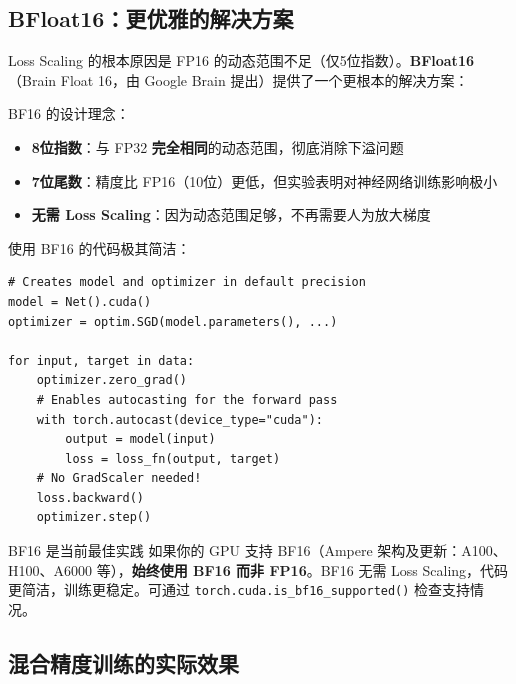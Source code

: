 \documentclass[a4paper]{article}
\begin{document}
\subsection{BFloat16：更优雅的解决方案}

Loss Scaling 的根本原因是 FP16 的动态范围不足（仅5位指数）。\textbf{BFloat16}（Brain Float 16，由 Google Brain 提出）提供了一个更根本的解决方案：





BF16 的设计理念：

\begin{itemize}
    \item \textbf{8位指数}：与 FP32 \textbf{完全相同}的动态范围，彻底消除下溢问题
    \item \textbf{7位尾数}：精度比 FP16（10位）更低，但实验表明对神经网络训练影响极小
    \item \textbf{无需 Loss Scaling}：因为动态范围足够，不再需要人为放大梯度
\end{itemize}





使用 BF16 的代码极其简洁：

\begin{lstlisting}[caption={PyTorch 中的 BF16 混合精度训练（无需 GradScaler）}]
# Creates model and optimizer in default precision
model = Net().cuda()
optimizer = optim.SGD(model.parameters(), ...)

for input, target in data:
    optimizer.zero_grad()
    # Enables autocasting for the forward pass
    with torch.autocast(device_type="cuda"):
        output = model(input)
        loss = loss_fn(output, target)
    # No GradScaler needed!
    loss.backward()
    optimizer.step()
\end{lstlisting}

\begin{importantbox}{BF16 是当前最佳实践}
如果你的 GPU 支持 BF16（Ampere 架构及更新：A100、H100、A6000 等），\textbf{始终使用 BF16 而非 FP16}。BF16 无需 Loss Scaling，代码更简洁，训练更稳定。可通过 \texttt{torch.cuda.is\_bf16\_supported()} 检查支持情况。
\end{importantbox}

\subsection{混合精度训练的实际效果}
\end{document}

